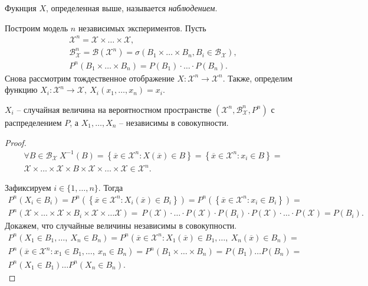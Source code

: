 \begin{definition}
	Фукнция $\displaystyle X$, определенная выше, называется \textit{наблюдением}.
\end{definition}
Построим модель $n$ независимых экспериментов. Пусть 
\begin{gather*}
    \mathcal{X}^{n} =\mathcal{X} \times \dotsc \times \mathcal{X},\\ \mathcal{B}_{\mathcal{X}}^{n} =\mathcal{B}\left(\mathcal{X}^{n}\right) =\sigma ( B_{1} \times \dotsc \times B_{n}, B_{i} \in \mathcal{B}_{\mathcal{X}}),\\ P^{n}( B_{1} \times \dotsc \times B_{n}) =P( B_{1}) \cdotp \dotsc \cdotp P( B_{n}).
\end{gather*}
Снова рассмотрим тождественное отображение $\displaystyle X:\mathcal{X}^{n}\rightarrow \mathcal{X}^{n}$. Также, определим функцию $\displaystyle X_{i} :\mathcal{X}^{n}\rightarrow \mathcal{X},\ X_{i}( x_{1} ,\dotsc ,x_{n}) =x_{i}$.
\begin{proposition}
	$\displaystyle X_{i}$ -- случайная величина на вероятностном пространстве $\displaystyle \left(\mathcal{X}^{n} ,\mathcal{B}_{\mathcal{X}}^{n} ,P^{n}\right)$ с распределением $\displaystyle P$, а $\displaystyle X_{1} ,\dotsc ,X_{n}$ -- независимы в совокупности.
\end{proposition}
\begin{proof}
    \begin{gather*}
        \forall B\in \mathcal{B}_{\mathcal{X}} \ X^{-1}( B) =\left\{\overline{x} \in \mathcal{X}^{n} :X(\overline{x}) \in B\right\} =\left\{\overline{x} \in \mathcal{X}^{n} :x_{i} \in B\right\} =\\ \mathcal{X} \times \dotsc \times \mathcal{X} \times B\times \mathcal{X} \times \dotsc \times \mathcal{X} \in \mathcal{X}^{n}.
    \end{gather*}

    Зафиксируем 
    $\displaystyle i\in \{1,\dotsc ,n\}$. Тогда
    \begin{gather*}
        P^{n}( X_{i} \in B_{i}) =P^{n}\left(\left\{\overline{x} \in \mathcal{X}^{n} :X_{i}(\overline{x}) \in B_{i}\right\}\right) =P^{n}\left(\left\{\overline{x} \in \mathcal{X}^{n} :x_{i} \in B_{i}\right\}\right) =\\ P^n(\mathcal{X} \times \dotsc \times \mathcal{X} \times B_{i} \times \mathcal{X} \times \dotsc \mathcal{X}) =\ P(\mathcal{X}) \cdot \dotsc \cdot P(\mathcal{X}) \cdot P( B_{i}) \cdot P(\mathcal{X}) \cdot \dotsc \cdot P(\mathcal{X}) =P( B_{i}).
    \end{gather*}
    Докажем, что случайные величины независимы в совокупности.
    \begin{gather*}
        P^{n}( X_{1} \in B_{1} ,\dotsc ,\ X_{n} \in B_{n}) =P^{n}\left(\overline{x} \in \mathcal{X}^{n} :X_{1}(\overline{x}) \in B_{1} ,\dotsc ,\ X_{n}(\overline{x}) \in B_{n}\right) =\\ P^n\left(\overline{x} \in \mathcal{X}^{n} :x_{1} \in B_{1} ,\dotsc ,\ x_{n} \in B_{n}\right) =P^{n}( B_{1} \times \dotsc \times B_{n}) =P( B_{1}) \dotsc P( B_{n}) =\\ P^n( X_{1} \in B_{1}) \dotsc P^n( X_{n} \in B_{n}).
    \end{gather*}
\end{proof}

